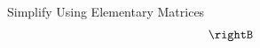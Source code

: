 %
%
%
%
%
\begin{example}{Simplify Using Elementary Matrices}\label{exa:simplifyusingelementarymatrices}
\begin{equation*}
\begin{array}{rrr}
\end{array}
\rightB
\end{equation*}
\end{example}
%
